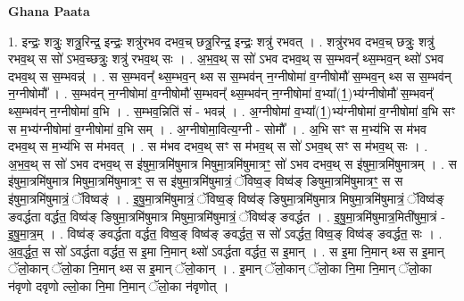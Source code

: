 \documentclass[17pt]{extarticle}
\begin{document}
\textbf{Ghana Paata } \newline

1. इन्द्रः॒ शत्रुः॒ शत्रु॒रिन्द्र॒ इन्द्रः॒ शत्रु॑रभव दभव॒च् छत्रु॒रिन्द्र॒ इन्द्रः॒ शत्रु॑ रभवत् । . शत्रु॑रभव दभव॒च् छत्रुः॒ शत्रु॑ रभव॒थ् स सो॑ ऽभव॒च्छत्रुः॒ शत्रु॑ रभव॒थ् सः । . अ॒भ॒व॒थ् स सो॑ ऽभव दभव॒थ् स स॒म्भवन्᳚ थ्स॒म्भव॒न् थ्सो॑ ऽभव दभव॒थ् स स॒म्भवन्न्॑ । . स स॒म्भवन्᳚ थ्स॒म्भव॒न् थ्स स स॒म्भव॑न् न॒ग्नीषोमा॑ व॒ग्नीषोमौ॑ स॒म्भव॒न् थ्स स स॒म्भव॑न् न॒ग्नीषोमौ᳚ । . स॒म्भव॑न् न॒ग्नीषोमा॑ व॒ग्नीषोमौ॑ स॒म्भवन्᳚ थ्स॒म्भव॑न् न॒ग्नीषोमा॑ व॒भ्या᳚(1॒)भ्य॑ग्नीषोमौ॑ स॒म्भवन्᳚ थ्स॒म्भव॑न् न॒ग्नीषोमा॑ व॒भि । . स॒म्भव॒न्निति॑ सं - भवन्न्॑ । . अ॒ग्नीषोमा॑ व॒भ्या᳚(1॒)भ्य॑ग्नीषोमा॑ व॒ग्नीषोमा॑ व॒भि सꣳ स म॒भ्य॑ग्नीषोमा॑ व॒ग्नीषोमा॑ व॒भि सम् । . अ॒ग्नीषोमा॒वित्य॒ग्नी - सोमौ᳚ । . अ॒भि सꣳ स म॒भ्य॑भि स म॑भव दभव॒थ् स म॒भ्य॑भि स म॑भवत् । . स म॑भव दभव॒थ् सꣳ स म॑भव॒थ् स सो॑ ऽभव॒थ् सꣳ स म॑भव॒थ् सः । . अ॒भ॒व॒थ् स सो॑ ऽभव दभव॒थ् स इ॑षुमा॒त्रमि॑षुमात्र मिषुमा॒त्रमि॑षुमात्रꣳ॒॒ सो॑ ऽभव दभव॒थ् स इ॑षुमा॒त्रमि॑षुमात्रम् । . स इ॑षुमा॒त्रमि॑षुमात्र मिषुमा॒त्रमि॑षुमात्रꣳ॒॒ स स इ॑षुमा॒त्रमि॑षुमात्रं॒ ॅविष्व॒ङ् 
विष्व॑ङ् ङिषुमा॒त्रमि॑षुमात्रꣳ॒॒ स स इ॑षुमा॒त्रमि॑षुमात्रं॒ ॅविष्वङ्॑ । . इ॒षु॒मा॒त्रमि॑षुमात्रं॒ ॅविष्व॒ङ् विष्व॑ङ् ङिषुमा॒त्रमि॑षुमात्र मिषुमा॒त्रमि॑षुमात्रं॒ ॅविष्व॑ङ् ङवर्द्धता वर्द्धत॒ विष्व॑ङ् ङिषुमा॒त्रमि॑षुमात्र मिषुमा॒त्रमि॑षुमात्रं॒ ॅविष्व॑ङ् ङवर्द्धत । . इ॒षु॒मा॒त्रमि॑षुमात्र॒मिती॑षुमा॒त्रं - इ॒षु॒मा॒त्र॒म् । . विष्व॑ङ् ङवर्द्धता वर्द्धत॒ विष्व॒ङ् विष्व॑ङ् ङवर्द्धत॒ स सो॑ ऽवर्द्धत॒ विष्व॒ङ् विष्व॑ङ् ङवर्द्धत॒ सः । . अ॒व॒र्द्ध॒त॒ स सो॑ ऽवर्द्धता वर्द्धत॒ स इ॒मा नि॒मान् थ्सो॑ ऽवर्द्धता वर्द्धत॒ स इ॒मान् । . स इ॒मा नि॒मान् थ्स स इ॒मान् ॅलो॒कान् ॅलो॒का नि॒मान् थ्स स इ॒मान् ॅलो॒कान् । . इ॒मान् ॅलो॒कान् ॅलो॒का नि॒मा नि॒मान् ॅलो॒का न॑वृणो दवृणो ल्लो॒का नि॒मा नि॒मान् ॅलो॒का न॑वृणोत् । \newline
\end{document}
